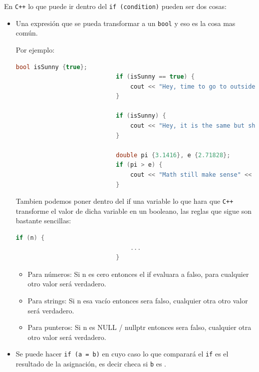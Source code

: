 \documentclass[12pt, fleqn]{report}                             %
\newcommand \Quote              {\qq}                           %
\theoremstyle{break}                                            %
\newcommand{\textCode}[1]  { \texttt{#1} }                      %
\newcommand{\Cpp}{\ignorespaces\textCode{C++}}                  %
\begin{document}
                En \Cpp lo que puede ir dentro del \textCode{if (condition)} pueden ser dos cosas:
                \begin{itemize}
                    \item Una expresión que se pueda transformar a un \textCode{bool} y eso es la cosa
                        mas común.

                        Por ejemplo:
                        \begin{lstlisting}[language=C++, gobble=28]
                            bool isSunny {true};
                            if (isSunny == true) {
                                cout << "Hey, time to go to outside" << '\n';
                            }

                            if (isSunny) {
                                cout << "Hey, it is the same but shorter syntax" << '\n';
                            }

                            double pi {3.1416}, e {2.71828};
                            if (pi > e) {
                                cout << "Math still make sense" << '\n';
                            }
                        \end{lstlisting}

                        Tambien podemos poner dentro del if una variable lo que hara
                        que \Cpp transforme el valor de dicha variable en un booleano,
                        las reglas que sigue son bastante sencillas:
                        \begin{lstlisting}[language=C++, gobble=28]
                            if (n) {
                                ...
                            }
                        \end{lstlisting}
                        \begin{itemize}
                            \item Para números: Si n es cero entonces el if evaluara a falso, para
                                cualquier otro valor será verdadero. 
                            \item Para strings: Si n esa vacío entonces sera falso, cualquier otra
                                otro valor será verdadero. 
                            \item Para punteros: Si n es NULL / nullptr entonces sera falso, cualquier otra
                                otro valor será verdadero. 
                        \end{itemize}

                    \item Se puede hacer \textCode{if (a = b)} en cuyo caso lo que comparará el 
                        \textCode{if} es el resultado de la asignación, es decir checa si 
                        \textCode{b} es \Quote{verdadero}.
                \end{itemize}
\end{document}
